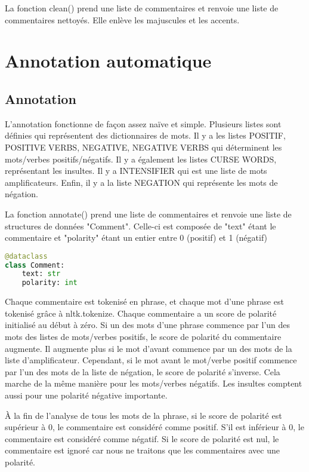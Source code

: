 \documentclass[a4paper, 12pt, openany]{book}
\begin{document}
La fonction clean() prend une liste de commentaires et renvoie une liste de commentaires nettoyés. Elle enlève les majuscules et les accents.

\chapter*{Annotation automatique}
\section*{Annotation}

L'annotation fonctionne de façon assez naïve et simple. Plusieurs listes sont définies qui représentent des dictionnaires de mots. Il y a les listes POSITIF, POSITIVE VERBS, NEGATIVE, NEGATIVE VERBS qui déterminent les mots/verbes positifs/négatifs. Il y a également les listes CURSE WORDS, représentant les insultes. Il y a INTENSIFIER qui est une liste de mots amplificateurs. Enfin, il y a la liste NEGATION qui représente les mots de négation.

La fonction annotate() prend une liste de commentaires et renvoie une liste de structures de données "Comment". Celle-ci est composée de "text" étant le commentaire et "polarity" étant un entier entre 0 (positif) et 1 (négatif)

\begin{lstlisting}[language=Python]
@dataclass
class Comment:
    text: str
    polarity: int
\end{lstlisting}

Chaque commentaire est tokenisé en phrase, et chaque mot d'une phrase est tokenisé grâce à nltk.tokenize. Chaque commentaire a un score de polarité initialisé au début à zéro. Si un des mots d'une phrase commence par l'un des mots des listes de mots/verbes positifs, le score de polarité du commentaire augmente. Il augmente plus si le mot d'avant commence par un des mots de la liste d'amplificateur. Cependant, si le mot avant le mot/verbe positif commence par l'un des mots de la liste de négation, le score de polarité s'inverse. Cela marche de la même manière pour les mots/verbes négatifs. Les insultes comptent aussi pour une polarité négative importante.

À la fin de l'analyse de tous les mots de la phrase, si le score de polarité est supérieur à 0, le commentaire est considéré comme positif. S'il est inférieur à 0, le commentaire est considéré comme négatif. Si le score de polarité est nul, le commentaire est ignoré car nous ne traitons que les commentaires avec une polarité.
\end{document}
